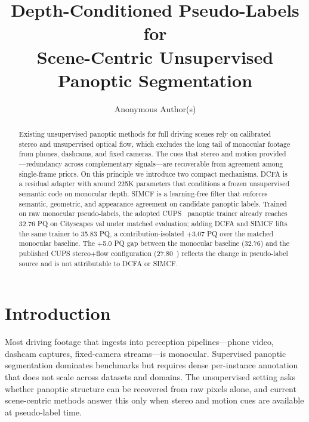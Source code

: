 \documentclass{article}
\title{Depth-Conditioned Pseudo-Labels for \\ Scene-Centric Unsupervised Panoptic Segmentation}
\author{Anonymous Author(s)}
\begin{document}
\raggedbottom

\maketitle

\begin{abstract}
Existing unsupervised panoptic methods for full driving scenes rely on calibrated stereo and unsupervised optical flow, which excludes the long tail of monocular footage from phones, dashcams, and fixed cameras. The cues that stereo and motion provided---redundancy across complementary signals---are recoverable from agreement among single-frame priors. On this principle we introduce two compact mechanisms. DCFA is a residual adapter with around 225K parameters that conditions a frozen unsupervised semantic code on monocular depth. SIMCF is a learning-free filter that enforces semantic, geometric, and appearance agreement on candidate panoptic labels. Trained on raw monocular pseudo-labels, the adopted CUPS~\cite{hahn2025cups} panoptic trainer already reaches 32.76 PQ on Cityscapes val under matched evaluation; adding DCFA and SIMCF lifts the same trainer to 35.83 PQ, a contribution-isolated $+$3.07 PQ over the matched monocular baseline. The +5.0 PQ gap between the monocular baseline (32.76) and the published CUPS stereo+flow configuration (27.80~\cite{hahn2025cups}) reflects the change in pseudo-label source and is not attributable to DCFA or SIMCF.
\end{abstract}

\section{Introduction}
\label{sec:intro}

Most driving footage that ingests into perception pipelines---phone video, dashcam captures, fixed-camera streams---is monocular. Supervised panoptic segmentation dominates benchmarks but requires dense per-instance annotation that does not scale across datasets and domains. The unsupervised setting asks whether panoptic structure can be recovered from raw pixels alone, and current scene-centric methods answer this only when stereo and motion cues are available at pseudo-label time.
\end{document}
